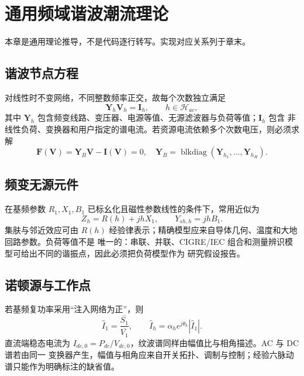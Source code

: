 \section{通用频域谐波潮流理论}
\begin{theorynote}
本章是通用理论推导，不是代码逐行转写。实现对应关系列于章末。
\end{theorynote}

\subsection{谐波节点方程}
对线性时不变网络，不同整数频率正交，故每个次数独立满足
\begin{equation}
\mathbf Y_h\mathbf V_h=\mathbf I_h,\qquad h\in\mathcal H_{ac},
\end{equation}
其中 $\mathbf Y_h$ 包含频变线路、变压器、电源等值、无源滤波器与负荷等值；$\mathbf I_h$ 包含
非线性负荷、变换器和用户指定的谱电流。若资源电流依赖多个次数电压，则必须求解
\begin{equation}
\mathbf F(\mathbf V)=\mathbf Y_B\mathbf V-\mathbf I(\mathbf V)=0,
\quad \mathbf Y_B=\operatorname{blkdiag}(\mathbf Y_{h_1},\ldots,\mathbf Y_{h_H}).
\end{equation}

\subsection{频变无源元件}
在基频参数 $R_1,X_1,B_1$ 已标幺化且磁性参数线性的条件下，常用近似为
\begin{equation}
Z_h=R(h)+jhX_1,\qquad Y_{sh,h}=jhB_1.
\end{equation}
集肤与邻近效应可由 $R(h)$ 经验律表示；精确模型应来自导体几何、温度和大地回路参数。负荷等值不是
唯一的：串联、并联、CIGRE/IEC 组合和测量辨识模型可给出不同的谐振点，因此必须把负荷模型作为
研究假设报告。

\subsection{诺顿源与工作点}
若基频复功率采用“注入网络为正”，则
\begin{equation}
\hat I_1=\frac{\overline{S_1}}{\overline{V_1}},\qquad
\hat I_h=\alpha_h e^{j\theta_h}|\hat I_1|.
\end{equation}
直流端稳态电流为 $I_{dc,0}=P_{dc}/V_{dc,0}$，纹波谱同样由幅值比与相角描述。AC 与 DC 谱若由同一
变换器产生，幅值与相角应来自开关拓扑、调制与控制；经验六脉动谱只能作为明确标注的缺省值。

